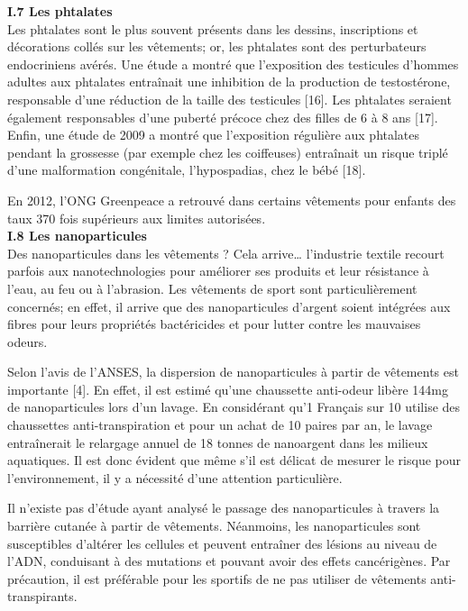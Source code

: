 \documentclass[8pt]{article}
\begin{document}
\textbf{I.7 Les phtalates}\\


Les phtalates sont le plus souvent présents dans les dessins, inscriptions et décorations collés sur les vêtements; or, les phtalates sont des perturbateurs endocriniens avérés. Une étude a montré que l’exposition des testicules d’hommes adultes aux phtalates entraînait une inhibition de la production de testostérone, responsable d’une réduction de la taille des testicules [16]. Les phtalates seraient également responsables d’une puberté précoce chez des filles de 6 à 8 ans [17]. Enfin, une étude de 2009 a montré que l’exposition régulière aux phtalates pendant la grossesse (par exemple chez les coiffeuses) entraînait un risque triplé d’une malformation congénitale, l’hypospadias, chez le bébé [18].

En 2012, l’ONG Greenpeace a retrouvé dans certains vêtements pour enfants des taux 370 fois supérieurs aux limites autorisées.\\

\textbf{I.8 Les nanoparticules}\\


Des nanoparticules dans les vêtements ? Cela arrive… l’industrie textile recourt parfois aux nanotechnologies pour améliorer ses produits et leur résistance à l’eau, au feu ou à l’abrasion. Les vêtements de sport sont particulièrement concernés; en effet, il arrive que des nanoparticules d’argent soient intégrées aux fibres pour leurs propriétés bactéricides et pour lutter contre les mauvaises odeurs.

Selon l’avis de l’ANSES, la dispersion de nanoparticules à partir de vêtements est importante [4]. En effet, il est estimé qu’une chaussette anti-odeur libère 144mg de nanoparticules lors d’un lavage. En considérant qu’1 Français sur 10 utilise des chaussettes anti-transpiration et pour un achat de 10 paires par an, le lavage entraînerait le relargage annuel de 18 tonnes de nanoargent dans les milieux aquatiques. Il est donc évident que même s’il est délicat de mesurer le risque pour l’environnement, il y a nécessité d’une attention particulière.

Il n’existe pas d’étude ayant analysé le passage des nanoparticules à travers la barrière cutanée à partir de vêtements. Néanmoins, les nanoparticules sont susceptibles d’altérer les cellules et peuvent entraîner des lésions au niveau de l’ADN, conduisant à des mutations et pouvant avoir des effets cancérigènes. Par précaution, il est préférable pour les sportifs de ne pas utiliser de vêtements anti-transpirants.\\
\end{document}

